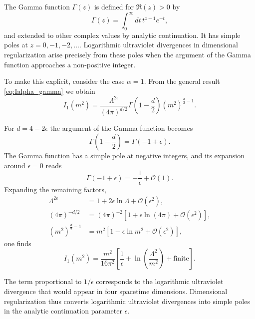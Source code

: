 The Gamma function $\Gamma(z)$ is defined for $\Re(z)>0$ by
\begin{equation}
\Gamma(z)=\int_0^\infty dt\, t^{z-1} e^{-t},
\end{equation}
and extended to other complex values by analytic continuation.
It has simple poles at $z=0,-1,-2,\ldots$.
Logarithmic ultraviolet divergences in dimensional regularization arise
precisely from these poles when the argument of the Gamma function
approaches a non-positive integer.

To make this explicit, consider the case $\alpha=1$.
From the general result \eqref{eq:Ialpha_gamma} we obtain
\begin{equation}
I_1(m^2)
=
\frac{\Lambda^{2\epsilon}}{(4\pi)^{d/2}}
\Gamma\!\left(1-\frac{d}{2}\right)
\left(m^2\right)^{\frac{d}{2}-1}.
\end{equation}

For $d=4-2\epsilon$ the argument of the Gamma function becomes
\begin{equation}
\Gamma\!\left(1-\frac{d}{2}\right)
=
\Gamma(-1+\epsilon).
\end{equation}
The Gamma function has a simple pole at negative integers, and its
expansion around $\epsilon=0$ reads
\begin{equation}
\Gamma(-1+\epsilon)
=
-\frac{1}{\epsilon}
+\mathcal{O}(1).
\end{equation}
Expanding the remaining factors,
\begin{align}
\Lambda^{2\epsilon} &= 1 + 2\epsilon\ln\Lambda + \mathcal{O}(\epsilon^2), \\
(4\pi)^{-d/2} &= (4\pi)^{-2}\left[1+\epsilon\ln(4\pi)+\mathcal{O}(\epsilon^2)\right], \\
(m^2)^{\frac{d}{2}-1} &= m^2\left[1-\epsilon\ln m^2+\mathcal{O}(\epsilon^2)\right],
\end{align}
one finds
\begin{equation}
I_1(m^2)
=
\frac{m^2}{16\pi^2}
\left[
\frac{1}{\epsilon}
+
\ln\!\left(\frac{\Lambda^2}{m^2}\right)
+\text{finite}
\right].
\label{eq:I1_pole}
\end{equation}

The term proportional to $1/\epsilon$ corresponds to the logarithmic
ultraviolet divergence that would appear in four spacetime dimensions.
Dimensional regularization thus converts logarithmic ultraviolet
divergences into simple poles in the analytic continuation parameter
$\epsilon$.

